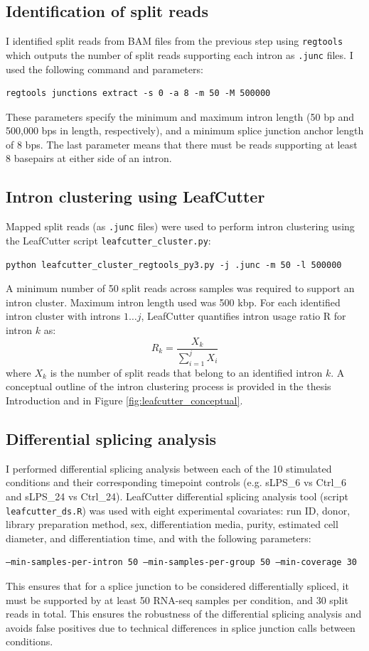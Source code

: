 \subsection{Identification of split reads}
I identified split reads from BAM files from the previous step using \Verb_regtools_ \cite{Cotto2023-yp} which outputs the number of split reads supporting each intron as \Verb_.junc_ files. I used the following command and parameters:
\begin{verbatim}regtools junctions extract -s 0 -a 8 -m 50 -M 500000 \end{verbatim}
These parameters specify the minimum and maximum intron length (50 bp and 500,000 bps in length, respectively), and a minimum splice junction anchor length of 8 bps. The last parameter means that there must be reads supporting at least 8 basepairs at either side of an intron. 

\subsection{Intron clustering using LeafCutter}
Mapped split reads (as \Verb_.junc_ files) were used to perform intron clustering using the LeafCutter script \Verb+leafcutter_cluster.py+:

\begin{verbatim}
python leafcutter_cluster_regtools_py3.py -j .junc -m 50 -l 500000
\end{verbatim}
A minimum number of 50 split reads across samples was required to support an intron cluster. Maximum intron length used was 500 kbp. 
For each identified intron cluster with introns $1…j$, LeafCutter quantifies intron usage ratio R for intron $k$ as:
$$R_{k}=\frac{X_k}{ \sum_{i=1}^{j}X_{i} }$$
where $X_k$ is the number of split reads that belong to an identified intron $k$. A conceptual outline of the intron clustering process is provided in the thesis Introduction and in Figure \ref{fig:leafcutter_conceptual}.

\subsection{Differential splicing analysis}
I performed differential splicing analysis between each of the 10 stimulated conditions and their corresponding timepoint controls (e.g. sLPS\_6 vs Ctrl\_6 and sLPS\_24 vs Ctrl\_24). LeafCutter differential splicing analysis tool (script \Verb+leafcutter_ds.R+) \cite{Li2018-ll} was used with eight experimental covariates: run ID, donor, library preparation method, sex, differentiation media, purity, estimated cell diameter, and differentiation time, and with  the following parameters:
\begin{verbatim}
–min-samples-per-intron 50 –min-samples-per-group 50 –min-coverage 30
\end{verbatim}
This ensures that for a splice junction to be considered differentially spliced, it must be supported by at least 50 RNA-seq samples per condition, and 30 split reads in total. This ensures the robustness of the differential splicing analysis and avoids false positives due to technical differences in splice junction calls between conditions.

